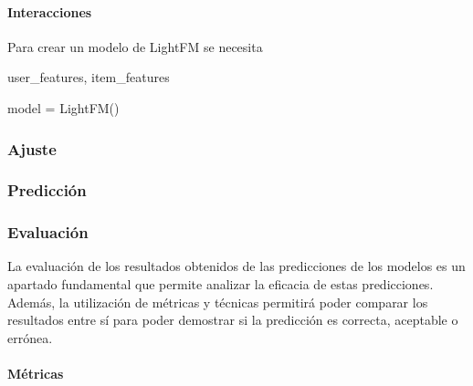\paragraph{Interacciones}


Para crear un modelo de LightFM se necesita

user\_features, item\_features 

model = LightFM() 


\subsubsection{Ajuste}
\subsubsection{Predicción}


\subsubsection{Evaluación}
La evaluación de los resultados obtenidos de las predicciones de los modelos es un apartado fundamental que permite analizar la eficacia de estas predicciones. Además, la utilización de métricas y técnicas permitirá poder comparar los resultados entre sí para poder demostrar si la predicción es correcta, aceptable o errónea.
\paragraph{Métricas}
